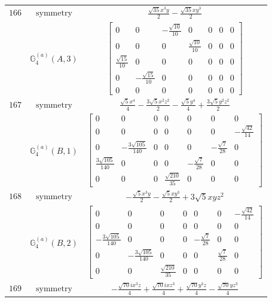 \documentclass[fleqn,8pt,landscape]{jsarticle}
\begin{document}
\begin{longtable}{ccc}
$ 166 $ & $ \text{symmetry} $ & $ \frac{\sqrt{35} x^{3} y}{2} - \frac{\sqrt{35} x y^{3}}{2} $ \\
$  $ & $ \mathbb{G}_{4}^{(a)}(A,3) $ & $ \begin{bmatrix} 0 & 0 & - \frac{\sqrt{10}}{10} & 0 & 0 & 0 & 0 \\ 0 & 0 & 0 & \frac{\sqrt{10}}{10} & 0 & 0 & 0 \\ \frac{\sqrt{15}}{10} & 0 & 0 & 0 & 0 & 0 & 0 \\ 0 & - \frac{\sqrt{15}}{10} & 0 & 0 & 0 & 0 & 0 \\ 0 & 0 & 0 & 0 & 0 & 0 & 0 \end{bmatrix} $ \\ \hline
$ 167 $ & $ \text{symmetry} $ & $ \frac{\sqrt{5} x^{4}}{4} - \frac{3 \sqrt{5} x^{2} z^{2}}{2} - \frac{\sqrt{5} y^{4}}{4} + \frac{3 \sqrt{5} y^{2} z^{2}}{2} $ \\
$  $ & $ \mathbb{G}_{4}^{(a)}(B,1) $ & $ \begin{bmatrix} 0 & 0 & 0 & 0 & 0 & 0 & 0 \\ 0 & 0 & 0 & 0 & 0 & 0 & - \frac{\sqrt{42}}{14} \\ 0 & - \frac{3 \sqrt{105}}{140} & 0 & 0 & 0 & - \frac{\sqrt{7}}{28} & 0 \\ \frac{3 \sqrt{105}}{140} & 0 & 0 & 0 & - \frac{\sqrt{7}}{28} & 0 & 0 \\ 0 & 0 & 0 & \frac{\sqrt{210}}{35} & 0 & 0 & 0 \end{bmatrix} $ \\ \hline
$ 168 $ & $ \text{symmetry} $ & $ - \frac{\sqrt{5} x^{3} y}{2} - \frac{\sqrt{5} x y^{3}}{2} + 3 \sqrt{5} x y z^{2} $ \\
$  $ & $ \mathbb{G}_{4}^{(a)}(B,2) $ & $ \begin{bmatrix} 0 & 0 & 0 & 0 & 0 & 0 & - \frac{\sqrt{42}}{14} \\ 0 & 0 & 0 & 0 & 0 & 0 & 0 \\ - \frac{3 \sqrt{105}}{140} & 0 & 0 & 0 & - \frac{\sqrt{7}}{28} & 0 & 0 \\ 0 & - \frac{3 \sqrt{105}}{140} & 0 & 0 & 0 & \frac{\sqrt{7}}{28} & 0 \\ 0 & 0 & \frac{\sqrt{210}}{35} & 0 & 0 & 0 & 0 \end{bmatrix} $ \\ \hline
$ 169 $ & $ \text{symmetry} $ & $ - \frac{\sqrt{70} i x^{3} z}{4} + \frac{\sqrt{70} i x z^{3}}{4} + \frac{\sqrt{70} y^{3} z}{4} - \frac{\sqrt{70} y z^{3}}{4} $ \\

\end{longtable}
\end{document}

